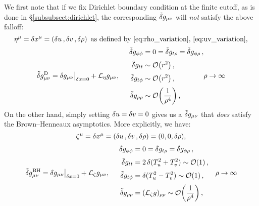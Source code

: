 \documentclass[12pt,a4paper,utf8]{article}
\newcommand{\tvar}[1]{\mathinner{\tilde{\delta} #1}}
\begin{document}
	We first note that if we fix Dirichlet boundary condition at the finite cutoff, as is done in \S\ref{subsubsect:dirichlet}, the corresponding $\tvar{g_{\mu\nu}}$ will \textit{not} satisfy the above falloff:
	\begin{equation}
		\eta^\mu = \mathinner{\delta x^\mu}
		= (\mathinner{\delta u},\mathinner{\delta v},\mathinner{\delta \rho})
	\,\ \text{as defined by \eqref{eq:rho_variation}, \eqref{eq:uv_variation}},
	\end{equation}
	\vspace*{-.8\baselineskip}
	\begin{equation}
		\tvar{g^\mrm{D}_{\mu\nu}}
		= \delta g_{\mu\nu}\big|_{\var{x} = 0}
			+ \ldv{\eta} g_{\mu\nu},
	\ \quad
	\begin{aligned}
		\tvar{g_{\phi\phi}}
		&= 0
		= \tvar{g_{t\rho}}
		= \tvar{g_{\phi\rho}},
	\\[.5ex]
		\tvar{g_{tt}}
		&\sim \order{r^2},
	\\[.5ex]
		\tvar{g_{t\phi}}
		&\sim \order{r^2},
	\\[.5ex]
		\tvar{g_{\rho\rho}}
		&\sim \order{\frac{1}{\rho^4}},
	\end{aligned}
		\rho\to\infty
	\end{equation}
	On the other hand, simply setting $\mathinner{\delta u} = \mathinner{\delta v} = 0$ gives us a $\tvar{g_{\mu\nu}}$ that \textit{does} satisfy the Brown--Henneaux asymptotics. More explicitly, we have:
	\begin{equation}
		\zeta^\mu = \mathinner{\delta x^\mu}
		= (\mathinner{\delta u},\mathinner{\delta v},\mathinner{\delta \rho})
		= (0,0,\mathinner{\delta \rho}),
	\end{equation}
	\vspace{-.8\baselineskip}
	\begin{equation}
		\tvar{g^\mrm{BH}_{\mu\nu}}
		= \delta g_{\mu\nu}\big|_{\var{x} = 0}
			+ \ldv{\zeta} g_{\mu\nu},
	\ \quad
	\begin{aligned}
		\tvar{g_{\phi\phi}}
		&= 0
		= \tvar{g_{t\rho}}
		= \tvar{g_{\phi\rho}},
	\\[.5ex]
		\tvar{g_{tt}}
		&= 2 \var{(T_u^2 + T_v^2)}
		\sim \order{1},
	\\[.5ex]
		\tvar{g_{t\phi}}
		&= \var{(T_u^2 - T_v^2)}
		\sim \order{1},
	\\[.5ex]
		\tvar{g_{\rho\rho}}
		&= (\ldv{\zeta} g)_{\rho\rho}
		\sim \order{\frac{1}{\rho^4}},
	\end{aligned}
	\quad \rho\to\infty
	\end{equation}
	
\end{document}
